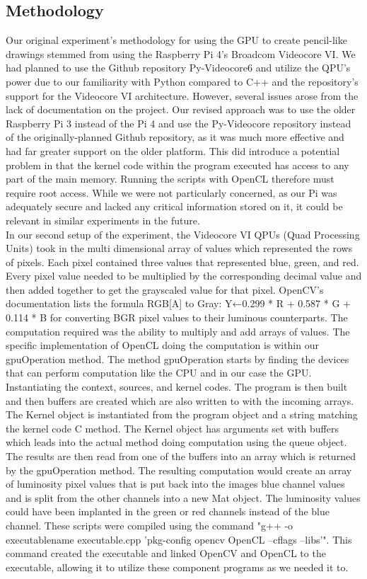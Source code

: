 \documentclass[conference]{IEEEtran}
\begin{document}
\subsection{Methodology}
Our original experiment's methodology for using the GPU to create pencil-like drawings stemmed from using the Raspberry Pi 4's Broadcom Videocore VI. We had planned to use the Github repository Py-Videocore6 and utilize the QPU's power due to our familiarity with Python compared to C++ and the repository's support for the Videocore VI architecture. However, several issues arose from the lack of documentation on the project. Our revised approach was to use the older Raspberry Pi 3 instead of the Pi 4 and use the Py-Videocore repository instead of the originally-planned Github repository, as it was much more effective and had far greater support on the older platform. This did introduce a potential problem in that the kernel code within the program executed has access to any part of the main memory. Running the scripts with OpenCL therefore must require root access. While we were not particularly concerned, as our Pi was adequately secure and lacked any critical information stored on it, it could be relevant in similar experiments in the future.\\
In our second setup of the experiment, the Videocore VI QPUs (Quad Processing Units) took in the multi dimensional array of values which represented the rows of pixels. Each pixel contained three values that represented blue, green, and red. Every pixel value needed to be multiplied by the corresponding decimal value and then added together to get the grayscaled value for that pixel. OpenCV's documentation lists the formula RGB[A] to Gray: Y←0.299 * R + 0.587 * G + 0.114 * B for converting BGR pixel values to their luminous counterparts. The computation required was the ability to multiply and add arrays of values. The specific implementation of OpenCL doing the computation is within our gpuOperation method. The method gpuOperation starts by finding the devices that can perform computation like the CPU and in our case the GPU. Instantiating the context, sources, and kernel codes. The program is then built and then buffers are created which are also written to with the incoming arrays. The Kernel object is instantiated from the program object and a string matching the kernel code  C method. The Kernel object has arguments set with buffers which leads into the actual method doing computation using the queue object. The results are then read from one of the buffers into an array which is returned by the gpuOperation method. The resulting computation would create an array of luminosity pixel values that is put back into the images blue channel values and is split from the other channels into a new Mat object. The luminosity values could have been implanted in the green or red channels instead of the blue channel. These scripts were compiled using the command "g++ -o executablename executable.cpp 'pkg-config opencv OpenCL --cflags --libs'". This command created the executable and linked OpenCV and OpenCL to the executable, allowing it to utilize these component programs as we needed it to. \\
\end{document}
